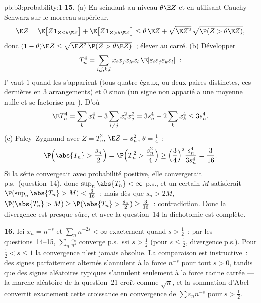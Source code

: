 \begin{solution}{pb:b3:probability:1}
\textbf{15.} (a) En scindant au niveau $\theta\E Z$ et en
utilisant Cauchy--Schwarz sur le morceau supérieur,
\[
\E Z = \E\bigl[Z\mathbf 1_{Z \leq \theta\E Z}\bigr] +
\E\bigl[Z\mathbf 1_{Z > \theta\E Z}\bigr]
\leq \theta\,\E Z + \sqrt{\E Z^2}\,
\sqrt{\P(Z > \theta\E Z)} ,
\]
donc $(1 - \theta)\E Z \leq \sqrt{\E Z^2\,\P(Z > \theta\E
Z)}$~; élever au carré. (b) Développer
\[
T_n^4 =
\sum_{i,j,k,l}x_ix_jx_kx_l\,
\E[\varepsilon_i\varepsilon_j\varepsilon_k\varepsilon_l]~:
\]
l' vaut $1$ quand les
 s'apparient (tous quatre égaux, ou deux paires
distinctes, ces dernières en $3$ arrangements) et $0$ sinon
(un signe non apparié a une moyenne nulle et se factorise par
). D'où
\[
\E T_n^4 = \sum_kx_k^4 + 3\sum_{i\neq j}x_i^2x_j^2 =
3s_n^4 - 2\sum_kx_k^4 \leq 3s_n^4 .
\]
(c) Paley--Zygmund avec $Z = T_n^2$, $\E Z = s_n^2$,
$\theta = \frac14$~:
\[
\P\Bigl(\abs{T_n} > \frac{s_n}2\Bigr) = \P\Bigl(T_n^2 >
\frac{s_n^2}4\Bigr) \geq \Bigl(\frac34\Bigr)^2
\frac{s_n^4}{3s_n^4} = \frac3{16} .
\]
Si la série convergeait avec probabilité positive, elle
convergerait p.s.\ (question~14), donc $\sup_n\abs{T_n} <
\infty$ p.s., et un certain $M$ satisferait
$\P(\sup_n\abs{T_n} > M) < \frac3{16}$~; mais dès que $s_n
> 2M$, $\P(\abs{T_n} > M) \geq \P(\abs{T_n} > \frac{s_n}2)
\geq \frac3{16}$~: contradiction. Donc la divergence est
presque sûre, et avec la question~14 la dichotomie est
complète.

\textbf{16.} Ici $x_n = n^{-s}$ et $\sum_nn^{-2s} < \infty$
exactement quand $s > \frac12$~: par les questions~14--15,
$\sum_n\frac{\varepsilon_n}{n^s}$ converge p.s.\ ssi $s >
\frac12$ (pour $s \leq \frac12$, divergence p.s.). Pour
$\frac12 < s \leq 1$ la convergence n'est jamais absolue.
La comparaison est instructive~: des signes parfaitement
alternés s'annulent à la force $n^{-s}$ pour tout $s > 0$,
tandis que des signes aléatoires typiques s'annulent
seulement à la force racine carrée --- la marche aléatoire
de la question~21 croît comme $\sqrt n$, et la sommation
d'Abel convertit exactement cette croissance en
convergence de $\sum\varepsilon_nn^{-s}$ pour $s >
\frac12$.


\end{solution}
